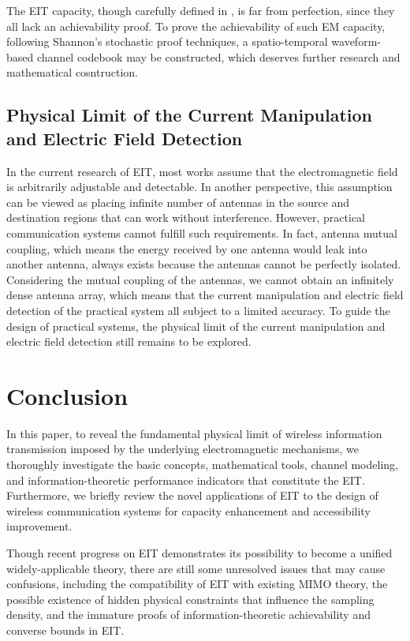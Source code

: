 \documentclass[journal,twocolumn]{IEEEtran}
\begin{document}
The EIT capacity, though carefully defined in \cite{wan2022mutual,zhang2022pdma}, is far from perfection, since they all lack an achievability proof. 
To prove the achievability of such EM capacity, following Shannon's stochastic proof techniques, a spatio-temporal waveform-based channel codebook may be constructed, which deserves further research and mathematical cosntruction.  

\subsection{Physical Limit of the Current Manipulation and Electric Field Detection}
In the current research of EIT, most works assume that the electromagnetic field is arbitrarily adjustable and detectable. In another perspective, this assumption can be viewed as placing infinite number of antennas in the source and destination regions that can work without interference. However, practical communication systems cannot fulfill such requirements. In fact, antenna mutual coupling, which means the energy received by one antenna would leak into another antenna, always exists because the antennas cannot be perfectly isolated. Considering the mutual coupling of the antennas, we cannot obtain an infinitely dense antenna array, which means that the current manipulation and electric field detection of the practical system all subject to a limited accuracy. To guide the design of practical systems, the physical limit of the current manipulation and electric field detection still remains to be explored. 

\section{Conclusion}
In this paper, to reveal the fundamental physical limit of wireless information transmission imposed by the underlying electromagnetic mechanisms, we thoroughly investigate the basic concepts, mathematical tools, channel modeling, and information-theoretic performance indicators that constitute the EIT. 
Furthermore, we briefly review the novel applications of EIT to the design of wireless communication systems for capacity enhancement and accessibility improvement. 

Though recent progress on EIT demonstrates its possibility to become a unified widely-applicable theory, there are still some unresolved issues that may cause confusions, including the compatibility of EIT with existing MIMO theory, the possible existence of hidden physical constraints that influence the sampling density, and the immature proofs of information-theoretic achievability and converse bounds in EIT. 


\footnotesize



\end{document}

